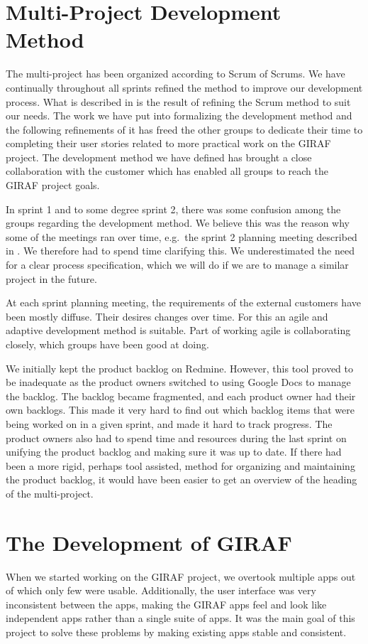 \section{Multi-Project Development Method}\label{conc:multi_project_process_eval}
The multi-project has been organized according to Scrum of Scrums. We have continually throughout all sprints refined the method to improve our development process. What is described in  is the result of refining the Scrum method to suit our needs. The work we have put into formalizing the development method and the following refinements of it has freed the other groups to dedicate their time to completing their user stories related to more practical work on the GIRAF project. The development method we have defined has brought a close collaboration with the customer which has enabled all groups to reach the GIRAF project goals.

In sprint 1 and to some degree sprint 2, there was some confusion among the groups regarding the development method. We believe this was the reason why some of the meetings ran over time, e.g.\ the \db sprint 2 planning meeting described in . We therefore had to spend time clarifying this. We underestimated the need for a clear process specification, which we will do if we are to manage a similar project in the future.

At each sprint planning meeting, the requirements of the external customers have been mostly diffuse. Their desires changes over time. For this an agile and adaptive development method is suitable. Part of working agile is collaborating closely, which groups have been good at doing.

We initially kept the product backlog on Redmine. However, this tool proved to be inadequate as the product owners switched to using Google Docs to manage the backlog. The backlog became fragmented, and each product owner had their own backlogs. This made it very hard to find out which backlog items that were being worked on in a given sprint, and made it hard to track progress. The product owners also had to spend time and resources during the last sprint on unifying the product backlog and making sure it was up to date. If there had been a more rigid, perhaps tool assisted, method for organizing and maintaining the product backlog, it would have been easier to get an overview of the heading of the multi-project. 

\section{The Development of GIRAF}\label{conc:multi_project_eval}
When we started working on the GIRAF project, we overtook multiple apps out of which only few were usable. Additionally, the user interface was very inconsistent between the apps, making the GIRAF apps feel and look like independent apps rather than a single suite of apps. It was the main goal of this project to solve these problems by making existing apps stable and consistent.

